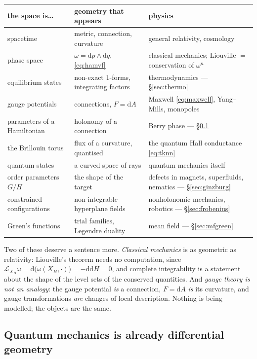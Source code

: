 \documentclass[10pt,a4paper]{article}
\newcommand{\dd}{\mathrm{d}}
\theoremstyle{plain}
\theoremstyle{definition}
\numberwithin{equation}{section}
\begin{document}
\medskip
{}
{\small
\renewcommand{\arraystretch}{1.2}
\noindent\begin{tabular}{@{}L{0.215\textwidth}L{0.265\textwidth}L{0.42\textwidth}@{}}
\toprule
\textbf{the space is\dots} & \textbf{geometry that appears} & \textbf{physics} \\
\midrule
spacetime & metric, connection, curvature & general relativity, cosmology \\
phase space & $\omega=\dd p\wedge\dd q$, \eqref{eq:hamvf} &
  classical mechanics; Liouville $=$ conservation of $\omega^n$ \\
equilibrium states & non-exact $1$-forms, integrating factors &
  thermodynamics --- \S\ref{sec:thermo} \\
gauge potentials & connections, $F=\dd A$ &
  Maxwell \eqref{eq:maxwell}, Yang--Mills, monopoles \\
parameters of a Hamiltonian & holonomy of a connection & Berry phase --- \S\ref{sec:qmgeom} \\
the Brillouin torus & flux of a curvature, quantised &
  the quantum Hall conductance \eqref{eq:tknn} \\
quantum states & a curved space of rays & quantum mechanics itself \\
order parameters $G/H$ & the shape of the target &
  defects in magnets, superfluids, nematics --- \S\ref{sec:ginzburg} \\
constrained configurations & non-integrable hyperplane fields &
  nonholonomic mechanics, robotics --- \S\ref{sec:frobenius} \\
Green's functions & trial families, Legendre duality &
  mean field --- \S\ref{sec:mfgreen} \\
\bottomrule
\end{tabular}}

\medskip
\noindent Two of these deserve a sentence more. \emph{Classical mechanics} is as geometric as
relativity: Liouville's theorem needs no computation, since
$\mathcal L_{X_H}\omega=\dd\big(\omega(X_H,\cdot)\big)=-\dd\dd H=0$, and complete integrability
is a statement about the shape of the level sets of the conserved quantities. And \emph{gauge
theory is not an analogy}: the gauge potential \emph{is} a connection, $F=\dd A$ \emph{is} its
curvature, and gauge transformations \emph{are} changes of local description. Nothing is being
modelled; the objects are the same.

\subsection{Quantum mechanics is already differential geometry}
\label{sec:qmgeom}
\end{document}
